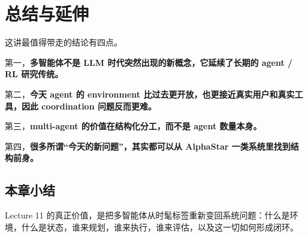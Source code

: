 \documentclass[a4paper]{article}
\begin{document}
\section{总结与延伸}
这讲最值得带走的结论有四点。

第一，\textbf{多智能体不是 LLM 时代突然出现的新概念，它延续了长期的 agent / RL 研究传统。}

第二，\textbf{今天 agent 的 environment 比过去更开放，也更接近真实用户和真实工具，因此 coordination 问题反而更难。}

第三，\textbf{multi-agent 的价值在结构化分工，而不是 agent 数量本身。}

第四，\textbf{很多所谓“今天的新问题”，其实都可以从 AlphaStar 一类系统里找到结构前身。}

\subsection{本章小结}
Lecture 11 的真正价值，是把多智能体从时髦标签重新变回系统问题：什么是环境，什么是状态，谁来规划，谁来执行，谁来评估，以及这一切如何形成闭环。
\end{document}
